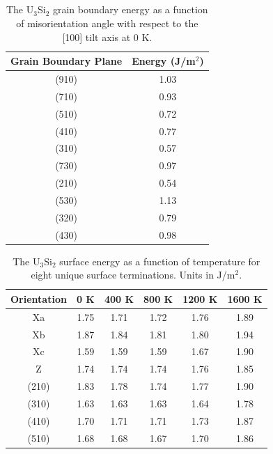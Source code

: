 \documentclass[review]{elsarticle}
\begin{document}
\begin{appendices}
\section{}

\setcounter{table}{0}
\renewcommand{\thetable}{A\arabic{table}}

\begin{table}[h]
\caption{The U$_{3}$Si$_{2}$ grain boundary energy as a function of misorientation angle with respect to the [100] tilt axis at 0 K.} \label{tab:0k}
\begin{center}
\begin{tabular}{|c|c|}
	\hline
	Grain Boundary Plane & Energy (J/m$^{2}$) \\
	 \hline
	 (910) & 1.03 \\
	 (710) & 0.93 \\
	 (510) & 0.72 \\
	 (410) & 0.77 \\
	 (310) & 0.57 \\	 
	 (730) & 0.97 \\
	 (210) & 0.54 \\
	 (530) & 1.13 \\
	 (320) & 0.79 \\
	 (430) & 0.98 \\
	 \hline
\end{tabular}
\end{center}
\label{default}
\end{table}

\begin{table}[h]
\caption{The U$_{3}$Si$_{2}$ surface energy as a function of temperature for eight unique surface terminations. Units in J/m$^{2}$.} \label{tab:surfT}
\begin{center}
\begin{tabular}{|c|c|c|c|c|c|}
	\hline
	Orientation & 0 K & 400 K & 800 K & 1200 K & 1600 K\\
	 \hline
	 Xa & 1.75	 & 1.71 & 1.72 & 1.76 & 1.89 \\
	 Xb & 1.87 & 1.84 & 1.81 & 1.80 & 1.94 \\
	 Xc & 1.59	 & 1.59 & 1.59 & 1.67 & 1.90 \\
	 Z & 1.74 & 1.74 & 1.74 & 1.76 & 1.85 \\
	 (210) & 1.83 & 	1.78 & 1.74 & 1.77 & 1.90 \\
	 (310) & 1.63 & 1.63 & 1.63 & 1.64 & 1.78 \\	 
	 (410) & 1.70 & 1.71 & 1.71 & 1.73 & 1.87 \\
	 (510) & 1.68 & 1.68 & 1.67 & 1.70 & 1.86 \\
	 \hline
\end{tabular}
\end{center}
\label{default}
\end{table}


\end{appendices}
\end{document}
